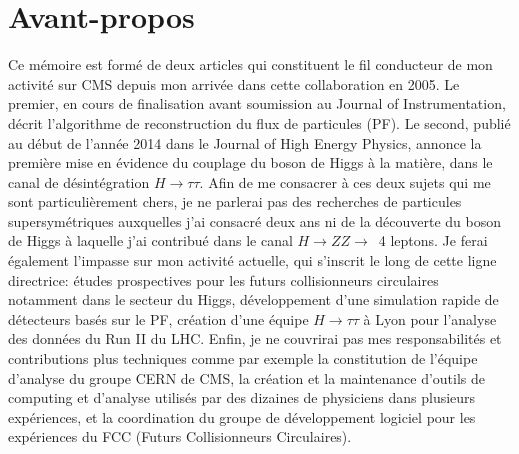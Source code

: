 \chapter*{Avant-propos}

Ce mémoire est formé de deux articles qui constituent le fil conducteur de mon activité sur CMS depuis mon arrivée dans cette collaboration en 2005. 
Le premier, en cours de finalisation avant soumission au Journal of Instrumentation, décrit l'algorithme de reconstruction du flux de particules (PF).
Le second, publié au début de l'année 2014 dans le Journal of High Energy Physics, annonce la première mise en évidence du couplage du boson de Higgs à la matière, dans le canal de désintégration $H \rightarrow \tau \tau$. 
Afin de me consacrer à ces deux sujets qui me sont particulièrement chers, 
je ne parlerai pas des recherches de particules supersymétriques auxquelles j'ai consacré deux ans
ni de la découverte du boson de Higgs à laquelle j'ai contribué dans le canal $H \rightarrow ZZ \rightarrow$~4 leptons. 
Je ferai également l'impasse sur mon activité actuelle, qui s'inscrit le long de cette ligne directrice: études prospectives pour les futurs collisionneurs circulaires notamment dans le secteur du Higgs, développement d'une simulation rapide de détecteurs basés sur le PF, 
création d'une équipe $H \rightarrow \tau \tau$ à Lyon pour l'analyse des données du Run II du LHC.
Enfin, je ne couvrirai pas mes responsabilités et contributions plus techniques comme par exemple la constitution de l'équipe d'analyse du groupe CERN de CMS, la création et la maintenance d'outils de computing et d'analyse utilisés par des dizaines de physiciens dans plusieurs expériences, et la coordination du groupe de développement logiciel pour les expériences du FCC (Futurs Collisionneurs Circulaires). 

